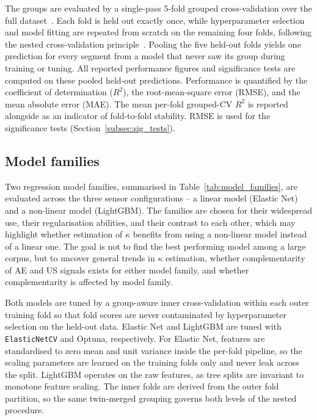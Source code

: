 The groups are evaluated by a single-pass 5-fold grouped cross-validation over the full dataset~\cite{stone_crossvalidatory_1974,kohavi_study_1995,roberts_crossvalidation_2017}. Each fold is held out exactly once, while hyperparameter selection and model fitting are repeated from scratch on the remaining four folds, following the nested cross-validation principle~\cite{varma_bias_2006,cawley_overfitting_2010}. Pooling the five held-out folds yields one prediction for every segment from a model that never saw its group during training or tuning. All reported performance figures and significance tests are computed on these pooled held-out predictions. Performance is quantified by the coefficient of determination ($R^2$), the root-mean-square error (RMSE), and the mean absolute error (MAE). The mean per-fold grouped-CV $R^2$ is reported alongside as an indicator of fold-to-fold stability. RMSE is used for the significance tests (Section~\ref{subsec:sig_tests}).

\subsection{Model families}
\label{subsec:model_families}

Two regression model families, summarised in Table~\ref{tab:model_families}, are evaluated across the three sensor configurations -- a linear model (Elastic Net) and a non-linear model (LightGBM). The families are chosen for their widespread use, their regularisation abilities, and their contrast to each other, which may highlight whether estimation of $\kappa$ benefits from using a non-linear model instead of a linear one. The goal is not to find the best performing model among a large corpus, but to uncover general trends in $\kappa$ estimation, whether complementarity of AE and US signals exists for either model family, and whether complementarity is affected by model family.

Both models are tuned by a group-aware inner cross-validation within each outer training fold so that fold scores are never contaminated by hyperparameter selection on the held-out data. Elastic Net and LightGBM are tuned with \texttt{ElasticNetCV} and Optuna, respectively. For Elastic Net, features are standardised to zero mean and unit variance inside the per-fold pipeline, so the scaling parameters are learned on the training folds only and never leak across the split. LightGBM operates on the raw features, as tree splits are invariant to monotone feature scaling. The inner folds are derived from the outer fold partition, so the same twin-merged grouping governs both levels of the nested procedure.

